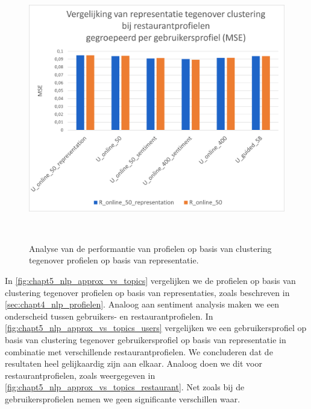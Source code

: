 \begin{figure}[H]
        \centering
        \parbox[b]{0.6\textwidth}{\includegraphics[width=\linewidth]{fig/chapt5/NLP/nlp_comparison_approx_restaurant.png}}\quad
        \parbox[b]{0.37\textwidth}{
        \label{fig:chapt5_nlp_approx_vs_topics_restaurant}}
        \\[.5cm]

        \caption{Analyse van de performantie van profielen op basis van clustering tegenover profielen op basis van representatie.}
        \label{fig:chapt5_nlp_approx_vs_topics}
\end{figure}

In \autoref{fig:chapt5_nlp_approx_vs_topics} vergelijken we de profielen op basis van clustering tegenover profielen op basis van representaties, zoals beschreven in \autoref{sec:chapt4_nlp_profielen}. Analoog aan sentiment analysis maken we een onderscheid tussen gebruikers- en restaurantprofielen. In \autoref{fig:chapt5_nlp_approx_vs_topics_users} vergelijken we een gebruikersprofiel op basis van clustering tegenover gebruikersprofiel op basis van representatie in combinatie met verschillende restaurantprofielen. We concluderen dat de resultaten heel gelijkaardig zijn aan elkaar. Analoog doen we dit voor restaurantprofielen, zoals weergegeven in \autoref{fig:chapt5_nlp_approx_vs_topics_restaurant}. Net zoals bij de gebruikersprofielen nemen we geen significante verschillen waar. 

